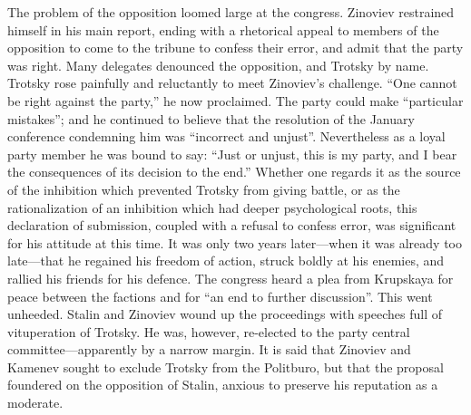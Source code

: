 The problem of the opposition loomed large at the congress. Zinoviev restrained himself in his main report, ending with a rhetorical appeal to members of the opposition to come to the tribune to confess their error, and admit that the party was right. Many delegates denounced the opposition, and Trotsky by name. Trotsky rose painfully and reluctantly to meet Zinoviev's challenge. ``One cannot be right against the party,'' he now proclaimed. The party could make ``particular mistakes''; and he continued to believe that the resolution of the January conference condemning him was ``incorrect and unjust''. Nevertheless as a loyal party member he was bound to say: ``Just or unjust, this is my party, and I bear the consequences of its decision to the end.'' Whether one regards it as the source of the inhibition which prevented Trotsky from giving battle, or as the rationalization of an inhibition which had deeper psychological roots, this declaration of submission, coupled with a refusal to confess error, was significant for his attitude at this time. It was only two years later---when it was already too late---that he regained his freedom of action, struck boldly at his enemies, and rallied his friends for his defence. The congress heard a plea from Krupskaya for peace between the factions and for ``an end to further discussion''. This went unheeded. Stalin and Zinoviev wound up the proceedings with speeches full of vituperation of Trotsky. He was, however, re-elected to the party central committee---apparently by a narrow margin. It is said that Zinoviev and Kamenev sought to exclude Trotsky from the Politburo, but that the proposal foundered on the opposition of Stalin, anxious to preserve his reputation as a moderate. 

